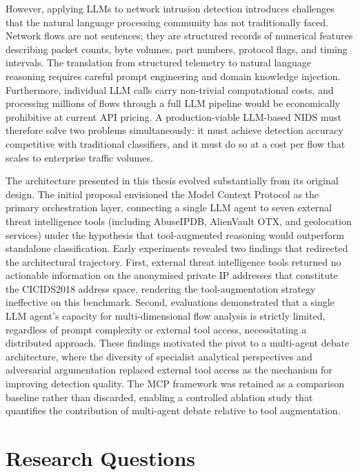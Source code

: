 \documentclass[../main.tex]{subfiles}
\begin{document}
However, applying LLMs to network intrusion detection introduces challenges that the natural language processing community has not traditionally faced. Network flows are not sentences; they are structured records of numerical features describing packet counts, byte volumes, port numbers, protocol flags, and timing intervals. The translation from structured telemetry to natural language reasoning requires careful prompt engineering and domain knowledge injection. Furthermore, individual LLM calls carry non-trivial computational costs, and processing millions of flows through a full LLM pipeline would be economically prohibitive at current API pricing. A production-viable LLM-based NIDS must therefore solve two problems simultaneously: it must achieve detection accuracy competitive with traditional classifiers, and it must do so at a cost per flow that scales to enterprise traffic volumes.

The architecture presented in this thesis evolved substantially from its original design. The initial proposal envisioned the Model Context Protocol \autocite{Anthropic2024} as the primary orchestration layer, connecting a single LLM agent to seven external threat intelligence tools (including AbuseIPDB, AlienVault OTX, and geolocation services) under the hypothesis that tool-augmented reasoning would outperform standalone classification. Early experiments revealed two findings that redirected the architectural trajectory. First, external threat intelligence tools returned no actionable information on the anonymised private IP addresses that constitute the CICIDS2018 address space, rendering the tool-augmentation strategy ineffective on this benchmark. Second, evaluations demonstrated that a single LLM agent's capacity for multi-dimensional flow analysis is strictly limited, regardless of prompt complexity or external tool access, necessitating a distributed approach. These findings motivated the pivot to a multi-agent debate architecture, where the diversity of specialist analytical perspectives and adversarial argumentation replaced external tool access as the mechanism for improving detection quality. The MCP framework was retained as a comparison baseline rather than discarded, enabling a controlled ablation study that quantifies the contribution of multi-agent debate relative to tool augmentation.

\section{Research Questions}
\label{sec:research-questions}
\end{document}
